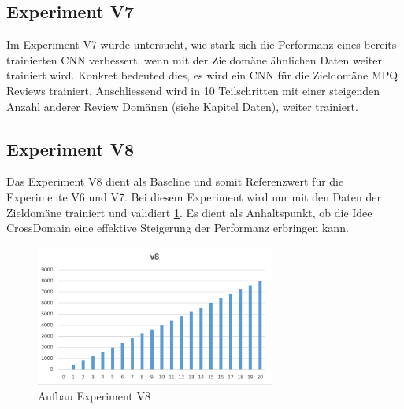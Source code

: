 \subsection{Experiment V7}
Im Experiment V7 wurde untersucht, wie stark sich die Performanz eines bereits trainierten CNN verbessert, wenn mit der Zieldomäne ähnlichen Daten weiter trainiert wird. Konkret bedeuted dies, es wird ein CNN für die Zieldomäne MPQ Reviews trainiert. Anschliessend wird in 10 Teilschritten mit einer steigenden Anzahl anderer Review Domänen (siehe Kapitel Daten), weiter trainiert.

\subsection{Experiment V8}
\label{methods:v8}
Das Experiment V8 dient als Baseline und somit Referenzwert für die Experimente V6 und V7.
Bei diesem Experiment wird nur mit den Daten der Zieldomäne trainiert und validiert \ref{fig:Method_V8}. Es dient als Anhaltspunkt, ob die Idee CrossDomain eine effektive  Steigerung der Performanz erbringen kann.
\begin{figure}[htbp]
	\centering
	\includegraphics[width=0.7\textwidth]{img/Method_V8}
	\caption{Aufbau Experiment V8}
	\label{fig:Method_V8}
\end{figure}

